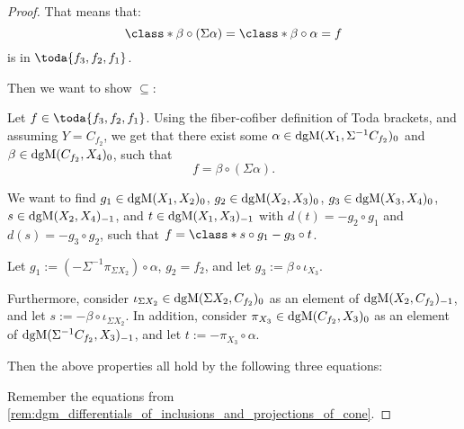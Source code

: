 \begin{proof}
    That means that:
    \[
        \class*{\beta \circ (\Sigma \alpha)} = \class*{\beta \circ \alpha} = f
    \]
    is in \( \toda{f_3, f_2, f_1} \).

    Then we want to show \( \subseteq \):

    Let \( f \in \toda{f_3, f_2, f_1} \). Using the fiber-cofiber definition of Toda brackets, and assuming \( Y = C_{f_2} \), we get that there exist some \( \alpha \in \operatorname{dgM}(X_1, \Sigma^{-1} C_{f_2})_0 \) and \( \beta \in \operatorname{dgM}(C_{f_2}, X_4)_0 \), such that
    \[
        f = \beta \circ (\Sigma \alpha).
    \]

    We want to find \( g_1 \in \operatorname{dgM}(X_1, X_2)_0 \), \( g_2 \in \operatorname{dgM}(X_2, X_3)_0 \), \( g_3 \in \operatorname{dgM}(X_3, X_4)_0 \), \( s \in \operatorname{dgM}(X_2, X_4)_{-1} \), and \( t \in \operatorname{dgM}(X_1, X_3)_{-1} \) with \( d(t) = - g_2 \circ g_1 \) and \( d(s) = -g_3 \circ g_2 \), such that \( f = \class*{s \circ g_1 - g_3 \circ t} \).

    Let \( g_1 := (-\Sigma^{-1} \pi_{\Sigma X_2}) \circ \alpha \), \( g_2 = f_2 \), and let \( g_3 := \beta \circ \iota_{X_3} \). 

    Furthermore, consider \( \iota_{\Sigma X_2} \in \operatorname{dgM}(\Sigma X_2, C_{f_2})_0 \) as an element of \( \operatorname{dgM}(X_2, C_{f_2})_{-1} \), and let \( s := - \beta \circ \iota_{\Sigma X_2} \). In addition, consider \( \pi_{X_3} \in \operatorname{dgM}(C_{f_2}, X_3)_0 \) as an element of \( \operatorname{dgM}(\Sigma^{-1} C_{f_2}, X_3)_{-1} \), and let \( t := - \pi_{X_3} \circ \alpha \).

    Then the above properties all hold by the following three equations:

    Remember the equations from \autoref{rem:dgm_differentials_of_inclusions_and_projections_of_cone}.


\end{proof}
